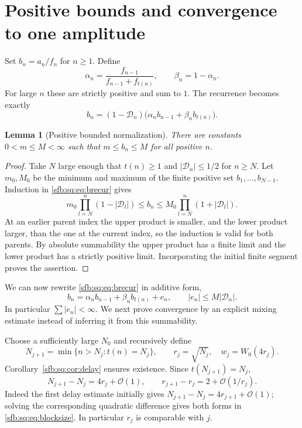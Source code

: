 \documentclass[11pt]{article}
\newtheorem{lemma}[theorem]{Lemma}
\theoremstyle{remark}\newtheorem{remark}[theorem]{Remark}
\newcommand{\OO}{\mathcal O}
\begin{document}
\section{Positive bounds and convergence to one amplitude}\label{sfb:sq:sec:convergence}
Set $b_n=a_n/f_n$ for $n\ge1$. Define
\begin{equation}\label{sfb:sq:eq:weights}
 \alpha_n=\frac{f_{n-1}}{f_{n-1}+f_{t(n)}},\qquad
 \beta_n=1-\alpha_n.
\end{equation}
For large $n$ these are strictly positive and sum to $1$. The recurrence becomes exactly
\begin{equation}\label{sfb:sq:eq:brecur}
 b_n=(1-\mathcal D_n)
       \bigl(\alpha_nb_{n-1}+\beta_nb_{t(n)}\bigr).
\end{equation}

\begin{lemma}[Positive bounded normalization]\label{sfb:sq:lem:bounded}
There are constants $0<m\le M<\infty$ such that $m\le b_n\le M$ for all positive $n$.
\end{lemma}
\begin{proof}
Take $N$ large enough that $t(n)\ge1$ and $|\mathcal D_n|\le1/2$ for $n\ge N$. Let $m_0,M_0$ be the minimum and maximum of the finite positive set $b_1,\ldots,b_{N-1}$. Induction in \eqref{sfb:sq:eq:brecur} gives
\[
 m_0\prod_{l=N}^n(1-|\mathcal D_l|)
 \le b_n\le
 M_0\prod_{l=N}^n(1+|\mathcal D_l|).
\]
At an earlier parent index the upper product is smaller, and the lower product larger, than the one at the current index, so the induction is valid for both parents. By absolute summability the upper product has a finite limit and the lower product has a strictly positive limit. Incorporating the initial finite segment proves the assertion.
\end{proof}

We can now rewrite \eqref{sfb:sq:eq:brecur} in additive form,
\begin{equation}\label{sfb:sq:eq:additive}
 b_n=\alpha_nb_{n-1}+\beta_nb_{t(n)}+e_n,
 \qquad |e_n|\le M|\mathcal D_n|.
\end{equation}
In particular $\sum|e_n|<\infty$. We next prove convergence by an explicit mixing estimate instead of inferring it from this summability.

Choose a sufficiently large $N_0$ and recursively define
\begin{equation}\label{sfb:sq:eq:Nblocks}
 N_{j+1}=\min\{n>N_j:t(n)=N_j\},\qquad
 r_j=\sqrt{N_j},\quad w_j=W_0(4r_j).
\end{equation}
Corollary~\ref{sfb:sq:cor:delay} ensures existence. Since $t(N_{j+1})=N_j$,
\begin{equation}\label{sfb:sq:eq:blocksize}
 N_{j+1}-N_j=4r_j+\OO(1),\qquad
 r_{j+1}-r_j=2+\OO(1/r_j).
\end{equation}
Indeed the first delay estimate initially gives $N_{j+1}-N_j=4r_{j+1}+\OO(1)$; solving the corresponding quadratic difference gives both forms in \eqref{sfb:sq:eq:blocksize}. In particular $r_j$ is comparable with $j$.
\end{document}
